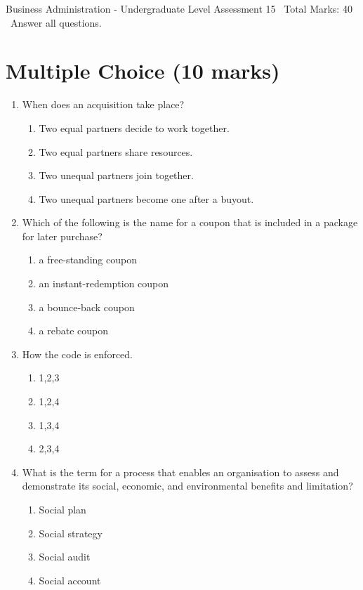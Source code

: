 \documentclass[12pt]{article}
\begin{document}
\begin{center}
Business Administration - Undergraduate Level Assessment 15 \
Total Marks: 40 \
Answer all questions.
\end{center}

\section*{Multiple Choice (10 marks)}
\begin{enumerate}[label=\arabic*.]
\item When does an acquisition take place?
\begin{enumerate}[label=(\alph*)]
    \item Two equal partners decide to work together.
    \item Two equal partners share resources.
    \item Two unequal partners join together.
    \item Two unequal partners become one after a buyout.
\end{enumerate}
\item Which of the following is the name for a coupon that is included in a package for later purchase?
\begin{enumerate}[label=(\alph*)]
    \item a free-standing coupon
    \item an instant-redemption coupon
    \item a bounce-back coupon
    \item a rebate coupon
\end{enumerate}
\item How the code is enforced.
\begin{enumerate}[label=(\alph*)]
    \item 1,2,3
    \item 1,2,4
    \item 1,3,4
    \item 2,3,4
\end{enumerate}
\item What is the term for a process that enables an organisation to assess and demonstrate its social, economic, and environmental benefits and limitation?
\begin{enumerate}[label=(\alph*)]
    \item Social plan
    \item Social strategy
    \item Social audit
    \item Social account

\end{enumerate}
\end{enumerate}
\end{document}
